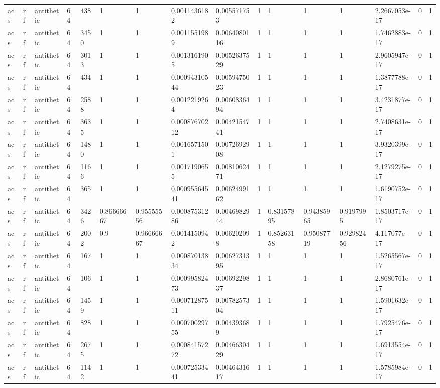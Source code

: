 \begin{tabular}{llllllllllllllll}
acs & rf & antithetic & 64 & 438 & 1 & 1 & 0.0011436182 & 0.005571753 & 1 & 1 & 1 & 1 & 2.2667053e-17 & 0 & 1 \\
acs & rf & antithetic & 64 & 3450 & 1 & 1 & 0.0011551989 & 0.0064080116 & 1 & 1 & 1 & 1 & 1.7462883e-17 & 0 & 1 \\
acs & rf & antithetic & 64 & 3013 & 1 & 1 & 0.0013161905 & 0.0052637529 & 1 & 1 & 1 & 1 & 2.9605947e-17 & 0 & 1 \\
acs & rf & antithetic & 64 & 434 & 1 & 1 & 0.00094310544 & 0.0059475023 & 1 & 1 & 1 & 1 & 1.3877788e-17 & 0 & 1 \\
acs & rf & antithetic & 64 & 2588 & 1 & 1 & 0.0012219264 & 0.0060836494 & 1 & 1 & 1 & 1 & 3.4231877e-17 & 0 & 1 \\
acs & rf & antithetic & 64 & 3635 & 1 & 1 & 0.00087670212 & 0.0042154741 & 1 & 1 & 1 & 1 & 2.7408631e-17 & 0 & 1 \\
acs & rf & antithetic & 64 & 1480 & 1 & 1 & 0.0016571501 & 0.0072692908 & 1 & 1 & 1 & 1 & 3.9320399e-17 & 0 & 1 \\
acs & rf & antithetic & 64 & 1166 & 1 & 1 & 0.0017190655 & 0.0081062471 & 1 & 1 & 1 & 1 & 2.1279275e-17 & 0 & 1 \\
acs & rf & antithetic & 64 & 365 & 1 & 1 & 0.00095564541 & 0.0062499162 & 1 & 1 & 1 & 1 & 1.6190752e-17 & 0 & 1 \\
acs & rf & antithetic & 64 & 3426 & 0.86666667 & 0.95555556 & 0.00087531286 & 0.0046982944 & 1 & 0.83157895 & 0.94385965 & 0.9197995 & 1.8503717e-17 & 0 & 1 \\
acs & rf & antithetic & 64 & 2002 & 0.9 & 0.96666667 & 0.0014150942 & 0.006202098 & 1 & 0.85263158 & 0.95087719 & 0.92982456 & 4.117077e-17 & 0 & 1 \\
acs & rf & antithetic & 64 & 167 & 1 & 1 & 0.00087013834 & 0.0062731395 & 1 & 1 & 1 & 1 & 1.5265567e-17 & 0 & 1 \\
acs & rf & antithetic & 64 & 106 & 1 & 1 & 0.00099582473 & 0.0069229837 & 1 & 1 & 1 & 1 & 2.8680761e-17 & 0 & 1 \\
acs & rf & antithetic & 64 & 1459 & 1 & 1 & 0.00071287511 & 0.0078257304 & 1 & 1 & 1 & 1 & 1.5901632e-17 & 0 & 1 \\
acs & rf & antithetic & 64 & 828 & 1 & 1 & 0.00070029755 & 0.004393689 & 1 & 1 & 1 & 1 & 1.7925476e-17 & 0 & 1 \\
acs & rf & antithetic & 64 & 2675 & 1 & 1 & 0.00084157272 & 0.0046630429 & 1 & 1 & 1 & 1 & 1.6913554e-17 & 0 & 1 \\
acs & rf & antithetic & 64 & 1142 & 1 & 1 & 0.00072533441 & 0.0046431617 & 1 & 1 & 1 & 1 & 1.5785984e-17 & 0 & 1 \\

\end{tabular}
